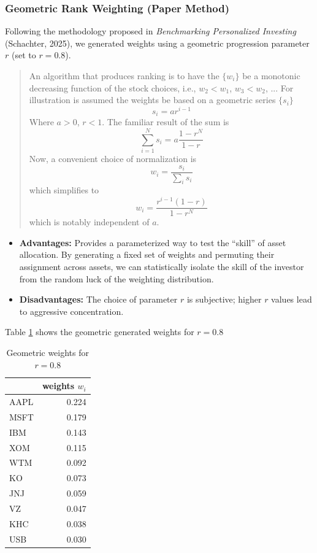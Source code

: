 \documentclass[12pt, a4paper]{article}
\begin{document}
	\subsubsection{Geometric Rank Weighting (Paper Method)}
	Following the methodology proposed in \textit{Benchmarking Personalized Investing} (Schachter, 2025), we generated weights using a geometric progression parameter $r$ (set to $r=0.8$).
	
	\begin{quote}
		An algorithm that produces ranking is to have the $\{w_i\}$ be a monotonic decreasing function of the stock choices, i.e., $w_2 < w_1$, $w_3 < w_2$, ... For illustration is assumed the weights be based on a geometric series $\{s_i\}$
		$$s_i = ar^{i-1}$$
		Where $a>0$, $r<1$. The familiar result of the sum is
		$$\sum_{i=1}^{N} s_i = a \frac{1-r^N}{1-r}$$
		Now, a convenient choice of normalization is 
		$$w_i = \frac{s_i}{\sum_i s_i}$$
		which simplifies to
		$$w_i = \frac{r^{i-1}(1-r)}{1-r^N}$$
		which is notably independent of $a$.
	\end{quote}
	
	
	\begin{itemize}
		\item \textbf{Advantages:} Provides a parameterized way to test the ``skill'' of asset allocation. By generating a fixed set of weights and permuting their assignment across assets, we can statistically isolate the skill of the investor from the random luck of the weighting distribution.
		\item \textbf{Disadvantages:} The choice of parameter $r$ is subjective; higher $r$ values lead to aggressive concentration.
	\end{itemize}
	
	Table \ref{tbl:geo0.8_weights} shows the geometric generated weights for $r=0.8$
	
	\begin{table}[h]
		\centering
		\begin{tabular}{lr}
			\toprule
			& weights $w_i$ \\
			\midrule
			AAPL & 0.224 \\
			MSFT & 0.179 \\
			IBM & 0.143 \\
			XOM & 0.115 \\
			WTM & 0.092 \\
			KO & 0.073 \\
			JNJ & 0.059 \\
			VZ & 0.047 \\
			KHC & 0.038 \\
			USB & 0.030 \\
			\bottomrule
		\end{tabular}
		\caption{Geometric weights for $r=0.8$}
		\label{tbl:geo0.8_weights}
	\end{table}
	
\end{document}
